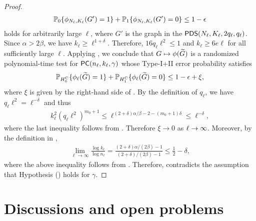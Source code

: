 \begin{proof}
\begin{align*}
\mathbb{P}_0 \{ \phi_{N_\ell,K_\ell}(G') =1 \} + \mathbb{P}_1 \{ \phi_{N_\ell,K_\ell}(G')=0 \} \le 1-\epsilon
\end{align*}
holds for arbitrarily large $\ell$, where $G'$ is the graph in the ${\sf PDS}(N_\ell,K_\ell,2q_\ell,q_\ell)$.
Since $\alpha>2\beta$, we have $k_{\ell} \ge \ell^{1+\delta}$.
Therefore, $16 q_{\ell} \ell^2 \le 1$ and $k_{\ell} \ge 6e\ell$ for all sufficiently large $\ell$. Applying , we conclude that $G \mapsto \phi({\widetilde{G}})$ is a randomized polynomial-time test for ${\sf PC}(n_\ell,k_\ell, \gamma)$ whose Type-I+II error probability satisfies
\begin{align}
\mathbb{P}_{H_0^{\rm C}} \{  \phi_{\ell}( {\widetilde{G}} ) =1\} + \mathbb{P}_{H_1^{\rm C} } \{\phi_\ell({\widetilde{G}} ) =0 \} \le 1- \epsilon+ \xi,
\label{eq:PlantedCliqueContradiction}
\end{align}
where $\xi$ is given by the right-hand side of . By the definition of $q_\ell$, we have $q_\ell \ell^2 =\ell^{-\delta}$ and thus
\begin{align*}
k_\ell^2 (q_\ell\ell^2)^{m_0+1} \le \ell^{  (2+\delta)\alpha/\beta -2 - (m_0+1) \delta}  \le \ell^{-\delta},
\end{align*}
where the last inequality follows from . Therefore $\xi\to0$ as $\ell\to\infty$. Moreover, by the definition in ,
\begin{align*}
  \lim_{\ell \to \infty} \frac{\log k_\ell}{ \log n_\ell} = \frac{(2+\delta)\alpha/(2\beta)-1 }{(2+\delta)/(2\beta)-1}\le \frac{1}{2}- \delta,
\end{align*}
where the above inequality follows from . Therefore,  contradicts the assumption that \PC Hypothesis () holds for $\gamma$.
\end{proof}
	
	
	
	
	\section{Discussions and open problems}
	\label{sec:discuss}
	
